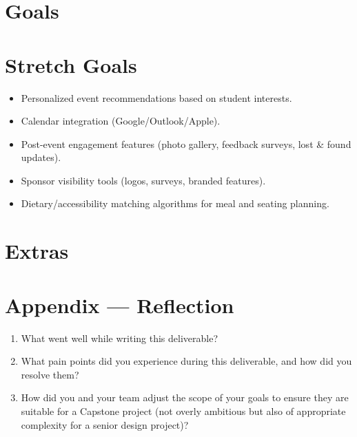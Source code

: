 \documentclass{article}
\begin{document}
\section{Goals}

\section{Stretch Goals}

\begin{itemize}
    \item Personalized event recommendations based on student interests.
    \item Calendar integration (Google/Outlook/Apple).
    \item Post-event engagement features (photo gallery, feedback surveys, lost \& found updates).
    \item Sponsor visibility tools (logos, surveys, branded features).
    \item Dietary/accessibility matching algorithms for meal and seating planning.
\end{itemize}

\section{Extras}



\newpage

\section*{Appendix --- Reflection}




\begin{enumerate}
    \item What went well while writing this deliverable? 
    \item What pain points did you experience during this deliverable, and how
    did you resolve them?
    \item How did you and your team adjust the scope of your goals to ensure
    they are suitable for a Capstone project (not overly ambitious but also of
    appropriate complexity for a senior design project)?
\end{enumerate}  
\end{document}
